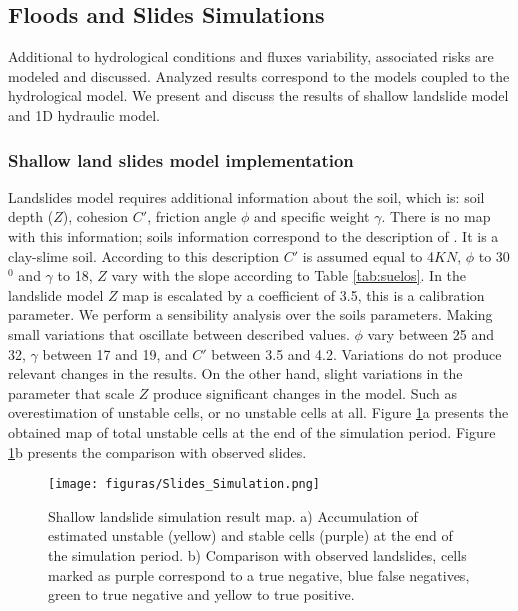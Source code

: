 {\subsection{Floods and Slides Simulations}

Additional to hydrological conditions and fluxes variability, associated risks are modeled and discussed.  Analyzed results correspond to the models coupled to the hydrological model.  We present and discuss the results of shallow landslide model and 1D hydraulic model.\\

\subsubsection{Shallow land slides model implementation}

Landslides model requires additional information about the soil, which is: soil depth ($Z$), cohesion $C'$, friction angle $\phi$ and specific weight $\gamma$.  There is no map with this information; soils information correspond to the description of \citet{Osorio2008}.  It is a clay-slime soil.  According to this description $C'$ is assumed equal to 4$KN$, $\phi$ to 30$^0$ and $\gamma$ to 18, $Z$ vary with the slope according to Table \ref{tab:suelos}. In the landslide model $Z$ map is escalated by a coefficient of 3.5, this is a calibration parameter.  We perform a sensibility analysis over the soils parameters.  Making small variations that oscillate between described values. $\phi$ vary between 25 and 32, $\gamma$ between 17 and 19, and $C'$ between 3.5 and 4.2.  Variations do not produce relevant changes in the results. On the other hand, slight variations in the parameter that scale $Z$ produce significant changes in the model. Such as overestimation of unstable cells, or no unstable cells at all.  Figure \ref{fig:SlidesComparison}a presents the obtained map of total unstable cells at the end of the simulation period. Figure \ref{fig:SlidesComparison}b presents the comparison with observed slides.\\  

\begin{figure}[t!]
\centering
 \texttt{[image: figuras/Slides\_Simulation.png]}
 \caption{Shallow landslide simulation result map. a) Accumulation of estimated unstable (yellow) and stable cells (purple) at the end of the simulation period. b) Comparison with observed landslides, cells marked as purple correspond to a true negative, blue false negatives, green to true negative and yellow to true positive.}
    \label{fig:SlidesComparison}
\end{figure}

}
